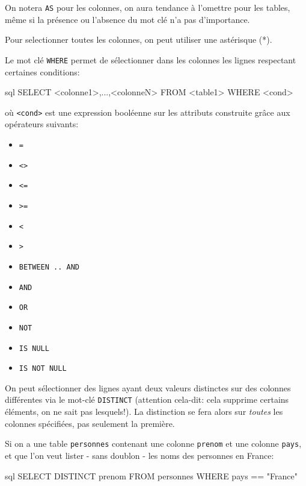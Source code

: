 \documentclass[a4paper]{scrartcl}
\begin{document}
				\rem On notera \texttt{AS} pour les colonnes, on aura tendance à l'omettre pour les tables, même si la présence ou l'absence du mot clé n'a pas d'importance.

				\rem Pour selectionner toutes les colonnes, on peut utiliser une astérisque (*).
				
				Le mot clé \texttt{WHERE} permet de sélectionner dans les colonnes les lignes respectant certaines conditions:
				\begin{code}{sql}
					SELECT <colonne1>,...,<colonneN>
					FROM <table1>
					WHERE <cond>
				\end{code}
				où \texttt{<cond>} est une expression booléenne sur les attributs construite grâce aux opérateurs suivants:
				\begin{multicols}{4}
				\begin{itemize}
					\item \texttt{=}
					\item \texttt{<>}
					\item \texttt{<=}
					\item \texttt{>=}
					\item \texttt{<}
					\item \texttt{>}
					\item \texttt{BETWEEN .. AND}
					\item \texttt{AND}
					\item \texttt{OR}
					\item \texttt{NOT}
					\item \texttt{IS NULL}
					\item \texttt{IS NOT NULL}
				\end{itemize}
				\end{multicols}

				On peut sélectionner des lignes ayant deux valeurs distinctes sur des colonnes différentes via le mot-clé \texttt{DISTINCT}
				(attention cela-dit: cela supprime certains éléments, on ne sait pas lesquels!). 
				La distinction se fera alors sur \textsl{toutes} les colonnes spécifiées, pas seulement la première.

				\exemple Si on a une table \texttt{personnes} contenant une colonne \texttt{prenom} et une colonne \texttt{pays}, 
				et que l'on veut lister - sans doublon - les noms des personnes en France:
				\begin{code}{sql}
					SELECT DISTINCT prenom
					FROM personnes
					WHERE pays == "France"
				\end{code}
\end{document}
